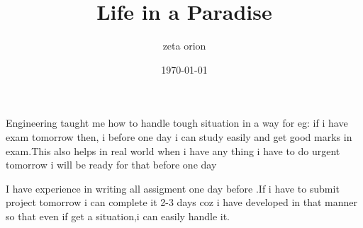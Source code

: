 \documentclass[12pt,a4paper]{article}
\begin{document}
\thispagestyle{plain}
\begin{center}
\title{Life in a Paradise}
\author{zeta orion}
\date{\today}
\maketitle

Engineering taught me how to handle tough situation in a way 
for eg: if i have  exam tomorrow then, i before one day i can study easily and get  good marks in exam.This also helps in real world
when i have any thing i have to do urgent tomorrow i will be ready for that before one day

I have experience in writing all assigment one day before .If i have to submit project tomorrow i can complete it 2-3 days coz i have developed in that manner so that even if get a situation,i can easily handle it.
\end{center}
\end{document}
